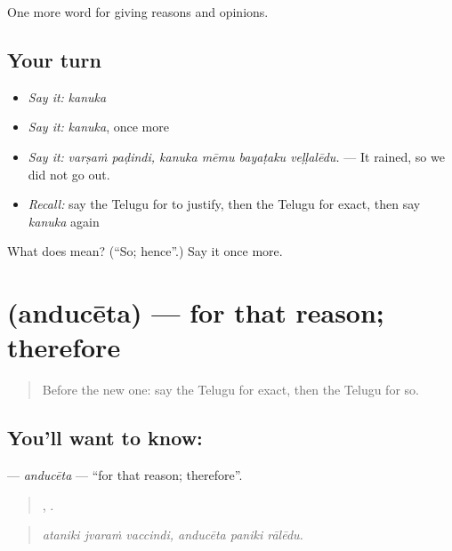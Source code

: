 \begin{grammarlens}[title={What you've built}]
One more word for giving reasons and opinions.
\end{grammarlens}

\subsection*{Your turn}
\begin{itemize}
\raggedright
  \item \emph{Say it:} \emph{kanuka}
  \item \emph{Say it:} \emph{kanuka}, once more
  \item \emph{Say it:} \emph{varṣaṁ paḍindi, kanuka mēmu bayaṭaku veḷḷalēdu.} — It rained, so we did not go out.
  \item \emph{Recall:} say the Telugu for to justify, then the Telugu for exact, then say \emph{kanuka} again
\end{itemize}

\begin{tcolorbox}[breakable,colback=teal!4,colframe=teal!35!black,title={Before you move on}]
What does  mean? (\textquotedblleft{}So; hence\textquotedblright{}.) Say it once more.
\end{tcolorbox}
\section[\texorpdfstring{\te{అందుచేత} (anducēta)}{అందుచేత (anducēta)}]{ (anducēta) — for that reason; therefore}

\label{lesson:TE-C395-anduceta}



\begin{quote}
Before the new one: say the Telugu for exact, then the Telugu for so.
\end{quote}

\subsection*{You'll want to know: }
\textbf{} — \emph{anducēta} — \textquotedblleft{}for that reason; therefore\textquotedblright{}.

\begin{quote}
  ,   .
\end{quote}

\begin{quote}
\emph{ataniki jvaraṁ vaccindi, anducēta paniki rālēdu.}
\end{quote}

